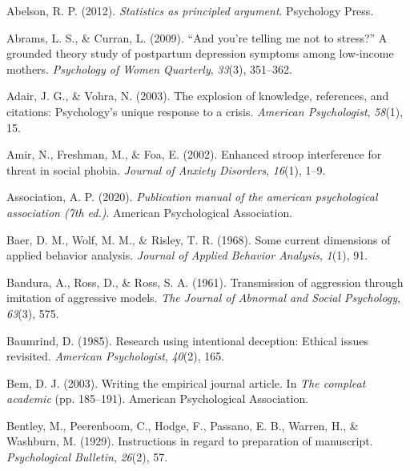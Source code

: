 \documentclass[
]{krantz}
\newlength{\cslhangindent}
\newenvironment{CSLReferences}[2] %
 {\begin{list}{}{%
  \setlength{\itemindent}{0pt}
  \setlength{\leftmargin}{0pt}
  \setlength{\parsep}{0pt}
  \ifodd #1
   \setlength{\leftmargin}{\cslhangindent}
   \setlength{\itemindent}{-1\cslhangindent}
  \fi
  \setlength{\itemsep}{#2\baselineskip}}}
 {\end{list}}
\begin{document}
\label{refs}
\begin{CSLReferences}{1}{0}
Abelson, R. P. (2012). \emph{Statistics as principled argument}. Psychology Press.

Abrams, L. S., \& Curran, L. (2009). {``And you're telling me not to stress?''} A grounded theory study of postpartum depression symptoms among low-income mothers. \emph{Psychology of Women Quarterly}, \emph{33}(3), 351--362.

Adair, J. G., \& Vohra, N. (2003). The explosion of knowledge, references, and citations: Psychology's unique response to a crisis. \emph{American Psychologist}, \emph{58}(1), 15.

Amir, N., Freshman, M., \& Foa, E. (2002). Enhanced stroop interference for threat in social phobia. \emph{Journal of Anxiety Disorders}, \emph{16}(1), 1--9.

Association, A. P. (2020). \emph{Publication manual of the american psychological association (7th ed.)}. American Psychological Association.

Baer, D. M., Wolf, M. M., \& Risley, T. R. (1968). Some current dimensions of applied behavior analysis. \emph{Journal of Applied Behavior Analysis}, \emph{1}(1), 91.

Bandura, A., Ross, D., \& Ross, S. A. (1961). Transmission of aggression through imitation of aggressive models. \emph{The Journal of Abnormal and Social Psychology}, \emph{63}(3), 575.

Baumrind, D. (1985). Research using intentional deception: Ethical issues revisited. \emph{American Psychologist}, \emph{40}(2), 165.

Bem, D. J. (2003). Writing the empirical journal article. In \emph{The compleat academic} (pp. 185--191). American Psychological Association.

Bentley, M., Peerenboom, C., Hodge, F., Passano, E. B., Warren, H., \& Washburn, M. (1929). Instructions in regard to preparation of manuscript. \emph{Psychological Bulletin}, \emph{26}(2), 57.


\end{CSLReferences}
\end{document}
